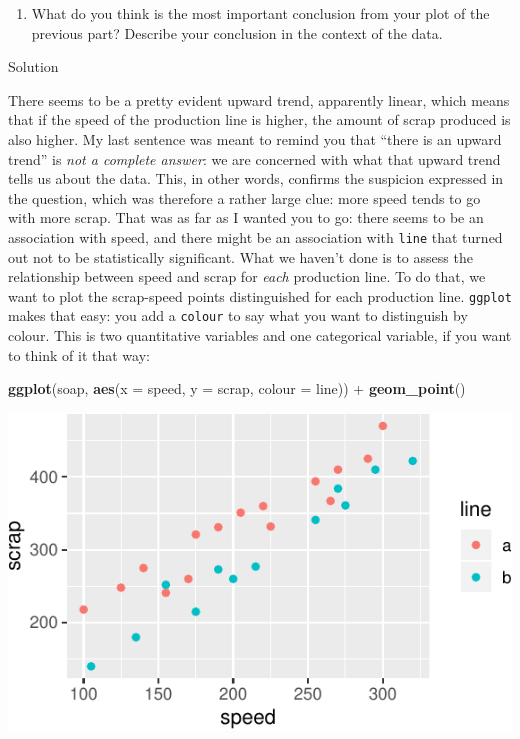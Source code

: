 \documentclass[]{tufte-book}
\newenvironment{Shaded}{}{}
\newcommand{\DataTypeTok}[1]{\textcolor[rgb]{0.56,0.13,0.00}{#1}}
\newcommand{\KeywordTok}[1]{\textcolor[rgb]{0.00,0.44,0.13}{\textbf{#1}}}
\newcommand{\NormalTok}[1]{#1}
\newcommand{\OperatorTok}[1]{\textcolor[rgb]{0.40,0.40,0.40}{#1}}
\newcommand{\StringTok}[1]{\textcolor[rgb]{0.25,0.44,0.63}{#1}}
\providecommand{\tightlist}{%
  \setlength{\itemsep}{0pt}\setlength{\parskip}{0pt}}
\theoremstyle{definition}
\theoremstyle{definition}
\theoremstyle{definition}
\theoremstyle{remark}
\begin{document}
\begin{enumerate}
\def\labelenumi{(\alph{enumi})}
\setcounter{enumi}{6}
\tightlist
\item
  What do you think is the most important conclusion from your plot of
  the previous part? Describe your conclusion in the context of the
  data.
\end{enumerate}

Solution

There seems to be a pretty evident upward trend, apparently linear,
which means that if the speed of the production line is higher, the
amount of scrap produced is also higher. My last sentence was meant to
remind you that ``there is an upward trend'' is \emph{not a complete
answer}: we are concerned with what that upward trend tells us about the
data. This, in other words, confirms the suspicion expressed in the
question, which was therefore a rather large clue: more speed tends to
go with more scrap. That was as far as I wanted you to go: there seems
to be an association with speed, and there might be an association with
\texttt{line} that turned out not to be statistically significant. What
we haven't done is to assess the relationship between speed and scrap
for \emph{each} production line. To do that, we want to plot the
scrap-speed points distinguished for each production line.
\texttt{ggplot} makes that easy: you add a \texttt{colour}
to say what you want to distinguish by colour. This is two quantitative
variables and one categorical variable, if you want to think of it that
way:

\begin{Shaded}
\begin{Highlighting}[]
\KeywordTok{ggplot}\NormalTok{(soap, }\KeywordTok{aes}\NormalTok{(}\DataTypeTok{x =}\NormalTok{ speed, }\DataTypeTok{y =}\NormalTok{ scrap, }\DataTypeTok{colour =}\NormalTok{ line)) }\OperatorTok{+}\StringTok{ }
\StringTok{    }\KeywordTok{geom_point}\NormalTok{()}
\end{Highlighting}
\end{Shaded}

\includegraphics{02-reading-in_files/figure-latex/unnamed-chunk-17-1}
\end{document}
